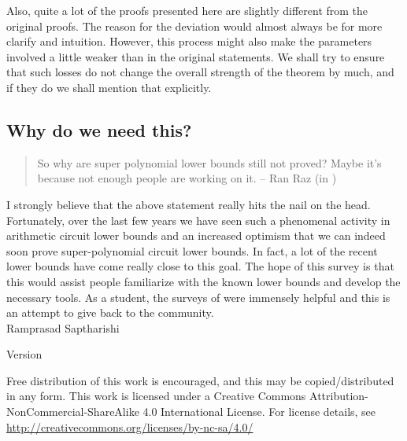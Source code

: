 Also, quite a lot of the proofs presented here are slightly different from the original proofs. 
The reason for the deviation would almost always be for more clarify and intuition. 
However, this process might also make the parameters involved a little weaker than in the original statements. 
We shall try to ensure that such losses do not change the overall strength of the theorem by much, and if they do we shall mention that explicitly. 

\subsection*{Why do we need this?}

\begin{quote}
So why are super polynomial lower bounds still not proved?  Maybe it's because not enough people are working on it.  -- Ran Raz (in \cite{raz10fool})
\end{quote}


I strongly believe that the above statement really hits the nail on the head. 
Fortunately, over the last few years we have seen such a phenomenal activity in arithmetic circuit lower bounds and an increased optimism that we can indeed soon prove super-polynomial circuit lower bounds. 
In fact, a lot of the recent lower bounds have come really close to this goal. 
The hope of this survey is that this would assist people familiarize with the known lower bounds and develop the necessary tools. 
As a student, the surveys of \cite{sy,ckw11} were immensely helpful and this is an attempt to give back to the community. \\


\noindent
Ramprasad Saptharishi

\noindent 
Version \currentversion\\

\noindent
\ccbyncsa

\medskip

\noindent
{\footnotesize Free distribution of this work is encouraged, and this may be copied/distributed in any form. 
This work is licensed under a Creative Commons Attribution-NonCommercial-ShareAlike 4.0 International License.
For license details, see \url{http://creativecommons.org/licenses/by-nc-sa/4.0/}}


